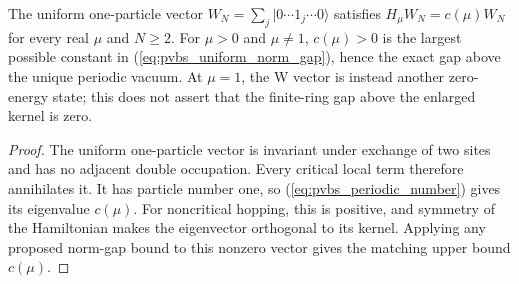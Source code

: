 \begin{lemma}
    \label{thm:pvbs_exact_periodic_gap}
    \leanok
    The uniform one-particle vector $W_N=\sum_j|0\cdots1_j\cdots0\rangle$
    satisfies $H_\mu W_N=c(\mu)W_N$ for every real $\mu$ and $N\ge2$.
    For $\mu>0$ and $\mu\ne1$, $c(\mu)>0$ is the largest possible
    constant in (\ref{eq:pvbs_uniform_norm_gap}), hence the exact
    gap above the unique periodic vacuum.
    At $\mu=1$, the W vector is instead another zero-energy state;
    this does not assert that the finite-ring gap above the enlarged
    kernel is zero.
\end{lemma}
\begin{proof}
    \leanok
    The uniform one-particle vector is invariant under exchange of two
    sites and has no adjacent double occupation. Every critical local
    term therefore annihilates it. It has particle number one, so
    (\ref{eq:pvbs_periodic_number}) gives its eigenvalue $c(\mu)$.
    For noncritical hopping, this is positive, and symmetry of the
    Hamiltonian makes the eigenvector orthogonal to its kernel.
    Applying any proposed norm-gap bound to this nonzero vector gives
    the matching upper bound $c(\mu)$.
\end{proof}


